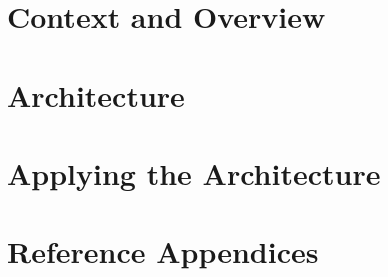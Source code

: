 \documentclass{scrreprt}
\begin{document}
\hypersetup{pageanchor=false}

\hypersetup{pageanchor=true}




\tableofcontents
\clearpage


\part{Context and Overview}



\part{Architecture}







\part{Applying the Architecture}


\appendix
\part{Reference Appendices}






\end{document}
